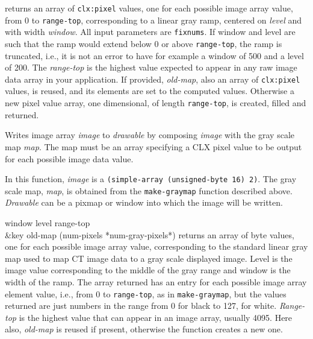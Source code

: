 \documentclass[twoside,openright,11pt]{report}
\newcommand{\tp}[1]{\texttt{#1}}
\begin{document}

{returns an array of \tp{clx:pixel} values, one for each possible
image array value, from 0 to \tp{range-top}, corresponding to a
linear gray ramp, centered on \emph{level} and with width
\emph{window}.  All input parameters are \tp{fixnums}.  If window
and level are such that the ramp would extend below 0 or above
\tp{range-top}, the ramp is truncated, i.e., it is not an error to
have for example a window of 500 and a level of 200.  The
\emph{range-top} is the highest value expected to appear in any raw
image data array in your application.  If provided, \emph{old-map},
also an array of \tp{clx:pixel} values, is reused, and its
elements are set to the computed values.  Otherwise a new pixel value
array, one dimensional, of length \tp{range-top}, is created,
filled and returned.}

{Writes image array \emph{image} to \emph{drawable} by composing
\emph{image} with the gray scale map \emph{map}.  The map must be an
array specifying a CLX pixel value to be output for each possible
image data value.}

In this function, \emph{image} is a
\tp{(simple-array~(unsigned-byte~16)~2)}.  The gray scale map,
\emph{map}, is obtained from the \tp{make-graymap} function
described above.  \emph{Drawable} can be a pixmap or window into which
the image will be written.

{window level range-top\\
	\hspace*{5cm} \&key old-map (num-pixels *num-gray-pixels*)}
{returns an array of byte values, one for each possible image array
value, corresponding to the standard linear gray map used to map CT
image data to a gray scale displayed image.  Level is the image value
corresponding to the middle of the gray range and window is the width
of the ramp.  The array returned has an entry for each possible image
array element value, i.e., from 0 to \tp{range-top}, as in
\tp{make-graymap}, but the values returned are just numbers in the
range from 0 for black to 127, for white.  \emph{Range-top} is the
highest value that can appear in an image array, usually 4095.  Here
also, \emph{old-map} is reused if present, otherwise the function
creates a new one.}
\end{document}

